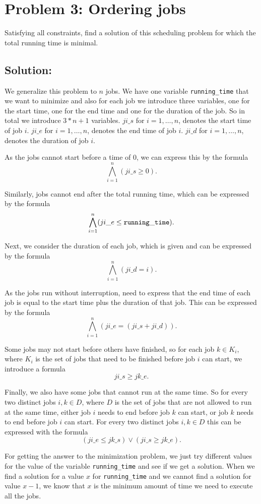 \documentclass[a4paper]{article}
\begin{document}
	\section*{Problem 3: Ordering jobs}
	Satisfying all constraints, find a solution of this scheduling problem for which the total running time is minimal.


	\subsection*{Solution:}
	We generalize this problem to $n$ jobs. We have one variable {\tt running\_time} that we want to minimize and also for each job we introduce three variables, one for the start time, one for the end time and one for the duration of the job. So in total we introduce $3*n + 1$ variables. $ji\_s$ for $i = 1,\ldots,n$, denotes the start time of job $i$. $ji\_e$ for $i = 1,\ldots,n$, denotes the end time of job $i$. $ji\_d$ for $i = 1,\ldots,n$, denotes the duration of job $i$.
	
	As the jobs cannot start before a time of 0, we can express this by the formula
\[ \bigwedge_{i=1}^n (ji\_s \geq 0).\]

	Similarly, jobs cannot end after the total running time, which can be expressed by the formula
\[ \bigwedge_{i=1}^n (ji\_e \leq {\tt running\_time}).\]

	Next, we consider the duration of each job, which is given and can be expressed by the formula
\[ \bigwedge_{i=1}^n (ji\_d = i).\]

	As the jobs run without interruption, need to express that the end time of each job is equal to the start time plus the duration of that job. This can be expressed by the formula
\[ \bigwedge_{i=1}^n (ji\_e = (ji\_s + ji\_d)).\]

	Some jobs may not start before others have finished, so for each job $k \in K_i$, where $K_i$ is the set of jobs that need to be finished before job $i$ can start, we introduce a formula
\[ ji\_s \geq jk\_e.\]

	Finally, we also have some jobs that cannot run at the same time. So for every two distinct jobs $i,k \in D$, where $D$ is the set of jobs that are not allowed to run at the same time, either job $i$ needs to end before job $k$ can start, or job $k$ needs to end before job $i$ can start. For every two distinct jobs $i,k \in D$ this can be expressed with the formula
\[ (ji\_e \leq jk\_s) \vee (ji\_s \geq jk\_e).\]
	
For getting the answer to the minimization problem, we just try different values for the value of the variable {\tt running\_time} and see if we get a solution. When we find a solution for a value $x$ for {\tt running\_time} and we cannot find a solution for value $x-1$, we know that $x$ is the minimum amount of time we need to execute all the jobs.\\
\end{document}
